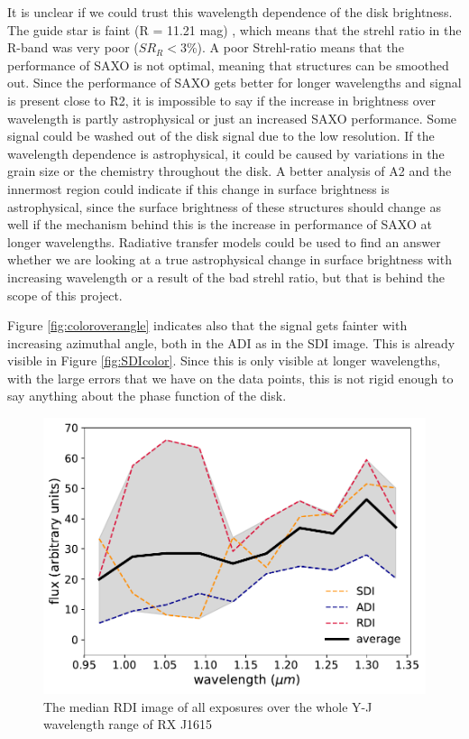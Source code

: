\documentclass[twoside,single]{lion-msc}
\begin{document}
It is unclear if we could trust this wavelength dependence of the disk brightness. The guide star is faint (R = 11.21 mag) \citep{Makarov2007}, which means that the strehl ratio in the R-band was very poor ($SR_R < 3$\%\citep{DeBoer2016}). A poor Strehl-ratio means that the performance of SAXO is not optimal, meaning that structures can be smoothed out. Since the performance of SAXO gets better for longer wavelengths and signal is present close to R2, it is impossible to say if the increase in brightness over wavelength is partly astrophysical or just an increased SAXO performance. Some signal could be washed out of the disk signal due to the low resolution. If the wavelength dependence is astrophysical, it could be caused by variations in the grain size or the chemistry throughout the disk. A better analysis of A2 and the innermost region could indicate if this change in surface brightness is astrophysical, since the surface brightness of these structures should change as well if the mechanism behind this is the increase in performance of SAXO at longer wavelengths. Radiative transfer models could be used to find an answer whether we are looking at a true astrophysical change in surface brightness with increasing wavelength or a result of the bad strehl ratio, but that is behind the scope of this project.
\bigskip

Figure \ref{fig:coloroverangle} indicates also that the signal gets fainter with increasing azimuthal angle, both in the ADI as in the SDI image. This is already visible in Figure \ref{fig:SDIcolor}. Since this is only visible at longer wavelengths, with the large errors that we have on the data points, this is not rigid enough to say anything about the phase function of the disk.
\bigskip

\begin{figure}
\vspace{-6mm}
\centering
\includegraphics[width=1\linewidth]{totflux}
\caption{The median RDI image of all exposures over the whole Y-J wavelength range of RX J1615}
\vspace{-4mm}
\end{figure}
\end{document}

